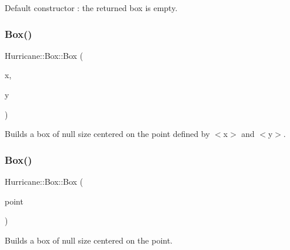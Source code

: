Default constructor \+: the returned box is empty. \mbox{\label{classHurricane_1_1Box_af53adb323e9e89eef4e96da9efc33fe9}} 
\subsubsection{\texorpdfstring{Box()}{Box()}\hspace{0.1cm}{\footnotesize\ttfamily [2/6]}}
{\footnotesize\ttfamily Hurricane\+::\+Box\+::\+Box (\begin{DoxyParamCaption}\item[{const \hyperlink{group__DbUGroup_ga4fbfa3e8c89347af76c9628ea06c4146}{Db\+U\+::\+Unit} \&}]{x,  }\item[{const \hyperlink{group__DbUGroup_ga4fbfa3e8c89347af76c9628ea06c4146}{Db\+U\+::\+Unit} \&}]{y }\end{DoxyParamCaption})}

Builds a box of null size centered on the point defined by {\ttfamily $<$x$>$} and {\ttfamily $<$y$>$}. \mbox{\label{classHurricane_1_1Box_a2f2aa57fa9486b508fca2a060648d04a}} 
\subsubsection{\texorpdfstring{Box()}{Box()}\hspace{0.1cm}{\footnotesize\ttfamily [3/6]}}
{\footnotesize\ttfamily Hurricane\+::\+Box\+::\+Box (\begin{DoxyParamCaption}\item[{const \hyperlink{classHurricane_1_1Point}{Point} \&}]{point }\end{DoxyParamCaption})}

Builds a box of null size centered on the point. \mbox{\label{classHurricane_1_1Box_a101cd5a10d6cf229ccedccbb5417ed55}} 
